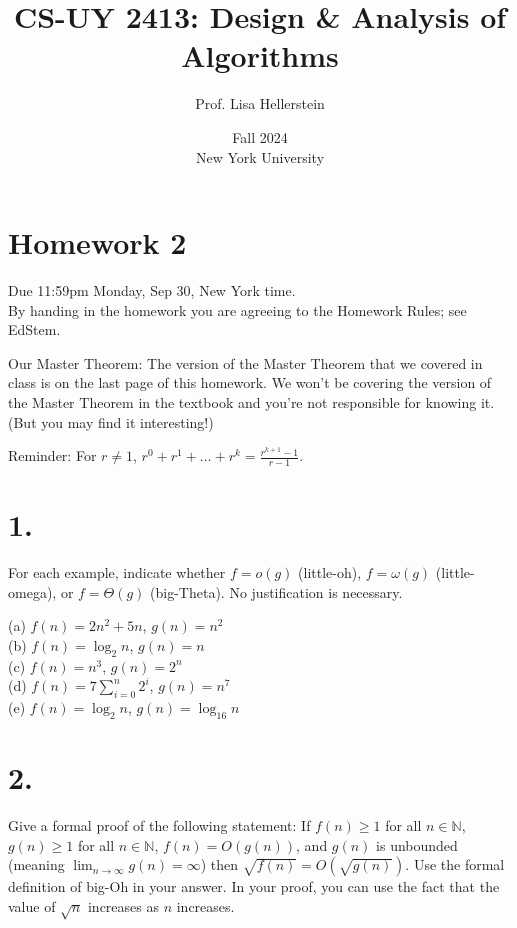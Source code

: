 \documentclass{article}
\begin{document}
\title{CS-UY 2413: Design \& Analysis of Algorithms}
\author{Prof. Lisa Hellerstein}
\date{Fall 2024 \\ New York University}

\maketitle

\section*{Homework 2}
Due 11:59pm Monday, Sep 30, New York time. \\
By handing in the homework you are agreeing to the Homework Rules; see EdStem.

Our Master Theorem: The version of the Master Theorem that we covered in class is on the last page of this homework. We won’t be covering the version of the Master Theorem in the textbook and you’re not responsible for knowing it. (But you may find it interesting!)

Reminder: For $r \neq 1$, $r^0 + r^1 + \dots + r^k = \frac{r^{k+1}-1}{r-1}$.

\section*{1.}
For each example, indicate whether $f = o(g)$ (little-oh), $f = \omega(g)$ (little-omega), or $f = \Theta(g)$ (big-Theta). No justification is necessary.

(a) $f(n) = 2n^2 + 5n$, $g(n) = n^2$ \\
(b) $f(n) = \log_2 n$, $g(n) = n$ \\
(c) $f(n) = n^3$, $g(n) = 2^n$ \\
(d) $f(n) = 7 \sum_{i=0}^n 2^i$, $g(n) = n^7$ \\
(e) $f(n) = \log_2 n$, $g(n) = \log_{16} n$


\section*{2.}
Give a formal proof of the following statement: If $f(n) \geq 1$ for all $n \in \mathbb{N}$, $g(n) \geq 1$ for all $n \in \mathbb{N}$, $f(n) = O(g(n))$, and $g(n)$ is unbounded (meaning $\lim_{n \to \infty} g(n) = \infty$) then $\sqrt{f(n)} = O(\sqrt{g(n)})$.
Use the formal definition of big-Oh in your answer. In your proof, you can use the fact that the value of $\sqrt{n}$ increases as $n$ increases.
\end{document}
